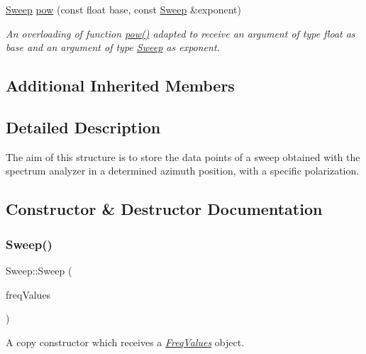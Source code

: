 \begin{DoxyCompactItemize}
\mbox{\label{structSweep_a879ae44efd2611562d05b90b24099e70}} 
\hyperlink{structSweep}{Sweep} \hyperlink{structSweep_a879ae44efd2611562d05b90b24099e70}{pow} (const float base, const \hyperlink{structSweep}{Sweep} \&exponent)
\begin{DoxyCompactList}\small\item\em An overloading of function {\ttfamily \hyperlink{structSweep_a11904d1c7aab3d73b5a8191019cf5328}{pow()}} adapted to receive an argument of type {\itshape float} as base and an argument of type {\itshape \hyperlink{structSweep}{Sweep}} as exponent. \end{DoxyCompactList}\end{DoxyCompactItemize}
\subsection*{Additional Inherited Members}


\subsection{Detailed Description}
The aim of this structure is to store the data points of a sweep obtained with the spectrum analyzer in a determined azimuth position, with a specific polarization. 

\subsection{Constructor \& Destructor Documentation}
\mbox{\label{structSweep_ae85ac9f2a48f93e3fc510118c7d67f7f}} 
\subsubsection{\texorpdfstring{Sweep()}{Sweep()}\hspace{0.1cm}{\footnotesize\ttfamily [1/2]}}
{\footnotesize\ttfamily Sweep\+::\+Sweep (\begin{DoxyParamCaption}\item[{const \hyperlink{structFreqValues}{Freq\+Values} \&}]{freq\+Values }\end{DoxyParamCaption})\hspace{0.3cm}{\ttfamily [inline]}}



A copy constructor which receives a {\itshape \hyperlink{structFreqValues}{Freq\+Values}} object. 

